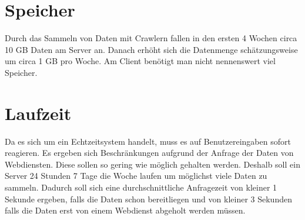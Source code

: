 \section{Speicher}
Durch das Sammeln von Daten mit Crawlern fallen in den ersten 4 Wochen circa 10 GB Daten am Server an. Danach erhöht sich die Datenmenge schätzungsweise um circa 1 GB pro Woche.
Am Client benötigt man nicht nennenswert viel Speicher.
\section{Laufzeit}
Da es sich um ein Echtzeitsystem handelt, muss es auf Benutzereingaben sofort reagieren. Es ergeben sich Beschränkungen aufgrund der Anfrage der Daten von Webdiensten. Diese sollen so gering wie möglich gehalten werden. Deshalb soll ein Server 24 Stunden 7 Tage die Woche laufen um möglichst viele Daten zu sammeln. Dadurch soll sich eine durchschnittliche Anfragezeit von kleiner 1 Sekunde ergeben, falls die Daten schon bereitliegen und von kleiner 3 Sekunden falls die Daten erst von einem Webdienst abgeholt werden müssen.
